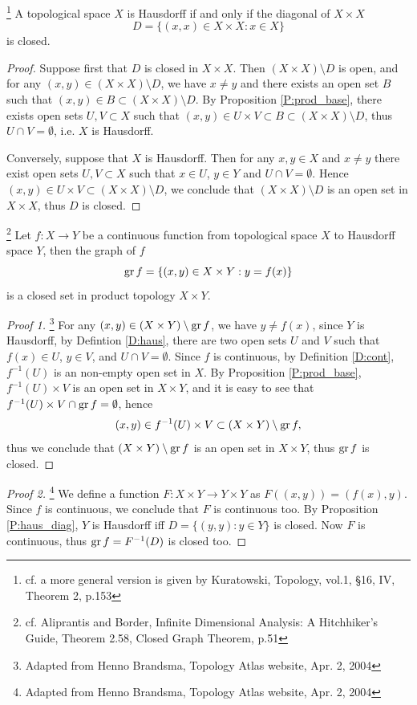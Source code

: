 \begin{proposition} \label{P:haus_diag}
\footnote{cf. a more general version is given by Kuratowski, Topology, vol.1, 
	\S 16, IV, Theorem 2, p.153}
A topological space $X$ is Hausdorff if and only if the diagonal of $X\times X$
\[
	D= \{ (x,x)\in X\times X: x\in X \}
\]
is closed.
\end{proposition}
\begin{proof}
Suppose first that $D$ is closed in $X\times X$. Then $(X\times X)\setminus D$
is open, and for any $(x,y)\in (X\times X)\setminus D$, we have $x\neq y$ and
there exists an open set $B$ such that 
$(x,y)\in B \subset (X\times X)\setminus D$. By Proposition
\ref{P:prod_base}, there exists open sets $U,V\subset X$ such that
$(x,y)\in U\times V \subset B \subset (X\times X)\setminus D$, thus 
$U\cap V=\emptyset$, i.e. $X$ is Hausdorff.

Conversely, suppose that $X$ is Hausdorff. Then for any $x,y\in X$ and $x\neq y$
there exist open sets $U,V\subset X$ such that $x\in U$, $y\in Y$ and 
$U\cap V=\emptyset$. Hence $(x,y)\in U\times V \subset (X\times X)\setminus D$,
we conclude that $(X\times X)\setminus D$ is an open set in $X\times X$, thus
$D$ is closed.
\end{proof}

\begin{lemma} \label{L:haus_graph}
\footnote{cf. Aliprantis and Border, Infinite Dimensional Analysis: A 
	  Hitchhiker's Guide, Theorem 2.58, Closed Graph Theorem, p.51}
Let $f:X\to Y$ be a continuous function from topological space $X$ to Hausdorff 
space $Y$, then the graph of $f$
\[
  \operatorname*{gr} f = \{ (x,y)\in X\times Y : y=f(x) \}
\]
is a closed set in product topology $X\times Y$.
\end{lemma}
\begin{proof}[Proof 1]
\footnote{Adapted from Henno Brandsma, Topology Atlas website, Apr. 2, 2004}
For any $(x,y)\in (X\times Y) \setminus \operatorname*{gr} f$, we have $y\neq f(x)$, since $Y$
is Hausdorff, by Defintion \ref{D:haus}, there are two open sets $U$ and
$V$ such that $f(x)\in U$, $y\in V$, and $U\cap V=\emptyset$.
Since $f$ is continuous, by Definition \ref{D:cont}, $f^{-1}(U)$ is an
non-empty open set in $X$. By Proposition \ref{P:prod_base}, $f^{-1}(U)\times V$
is an open set in $X\times Y$, and it is easy to see that 
$f^{-1}(U)\times V \cap \operatorname*{gr} f=\emptyset$, hence 
\[
  (x,y)\in f^{-1}(U)\times V \subset (X\times Y) \setminus \operatorname*{gr} f,
\]
thus we conclude that $(X\times Y) \setminus \operatorname*{gr} f$ is an open set in 
$X\times Y$, thus $\operatorname*{gr} f$ is closed.
\end{proof}
\begin{proof}[Proof 2]
	\footnote{Adapted from Henno Brandsma, Topology Atlas website, Apr. 2, 2004}
We define a function $F:X\times Y\to Y\times Y$ as $F((x,y))=(f(x),y)$. Since
$f$ is continuous, we conclude that $F$ is continuous too. By Proposition
\ref{P:haus_diag}, $Y$ is Hausdorff iff $D=\{ (y,y):y\in Y \}$ is closed. Now $F$
is continuous, thus $\operatorname*{gr} f=F^{-1}(D)$ is closed too.
\end{proof}

